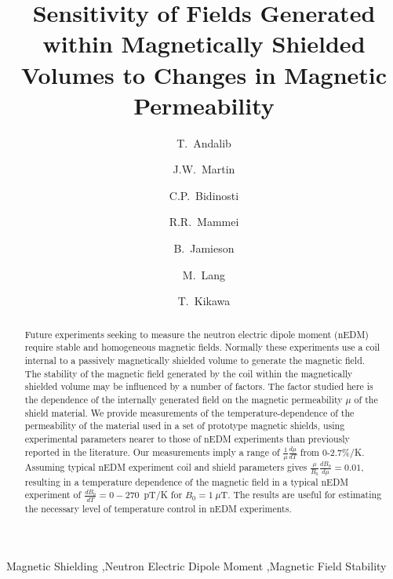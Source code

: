 \documentclass[review,number,sort&compress]{elsarticle}
\begin{document}
\begin{frontmatter}

\title{Sensitivity of Fields Generated within Magnetically Shielded
  Volumes to Changes in Magnetic Permeability}

\author[manitoba]{T.~Andalib}
\author[winnipeg,manitoba]{J.W.~Martin}
\author[winnipeg,manitoba]{C.P.~Bidinosti}
\author[winnipeg,manitoba]{R.R.~Mammei}
\author[winnipeg,manitoba]{B.~Jamieson}
\author[manitoba]{M.~Lang}
\author[triumf]{T.~Kikawa}


\address[winnipeg]{Physics Department, The University of Winnipeg, 515 Portage Avenue, Winnipeg, MB, R3B 2E9, Canada}
\address[manitoba]{Department of Physics and Astronomy, University of Manitoba, Winnipeg, MB R3T 2N2, Canada}
\address[triumf]{TRIUMF, 4004 Wesbrook Mall, Vancouver, BC V6T 2A3, Canada}


\begin{abstract}
Future experiments seeking to measure the neutron electric dipole
moment (nEDM) require stable and homogeneous magnetic fields.
Normally these experiments use a coil internal to a passively
magnetically shielded volume to generate the magnetic field.  The
stability of the magnetic field generated by the coil within the
magnetically shielded volume may be influenced by a number of factors.
The factor studied here is the dependence of the internally generated
field on the magnetic permeability $\mu$ of the shield material.  We
provide measurements of the temperature-dependence of the permeability
of the material used in a set of prototype magnetic shields, using
experimental parameters nearer to those of nEDM experiments than
previously reported in the literature.  Our measurements imply a range
of $\frac{1}{\mu}\frac{d\mu}{dT}$ from 0-2.7\%/K. Assuming typical
nEDM experiment coil and shield parameters gives
$\frac{\mu}{B_0}\frac{dB_0}{d\mu}=0.01$, resulting in a temperature
dependence of the magnetic field in a typical nEDM experiment of
$\frac{dB_0}{dT}=0-270$~pT/K for $B_0=1~\mu$T.  The results are useful
for estimating the necessary level of temperature control in nEDM
experiments.
\end{abstract}

\begin{keyword}
Magnetic Shielding \sep Neutron Electric Dipole Moment \sep Magnetic Field Stability
\end{keyword}

\end{frontmatter}
\end{document}
